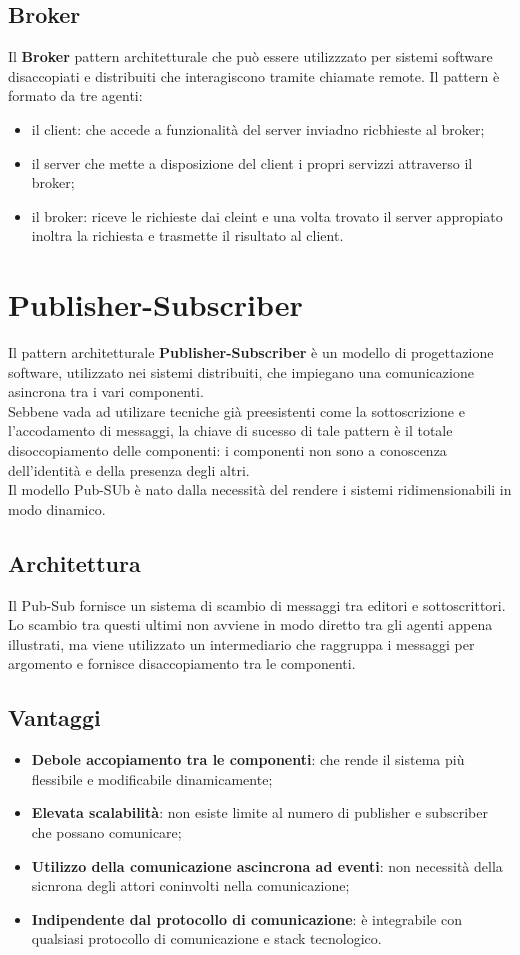 \documentclass{article}
\begin{document}
\subsection{Broker}
Il \textbf{Broker} pattern architetturale che può essere utilizzzato per sistemi software disaccopiati e distribuiti che interagiscono tramite chiamate remote.
Il pattern è formato da tre agenti:
\begin{itemize}
    \item il client: che accede a funzionalità del server inviadno ricbhieste al broker;
    \item il server che mette a disposizione del client i propri servizzi attraverso il broker;
    \item il broker: riceve le richieste dai cleint e una volta trovato il server appropiato inoltra la richiesta e trasmette il risultato al client.
\end{itemize}
\section{Publisher-Subscriber}
Il pattern architetturale \textbf{Publisher-Subscriber} è un modello di progettazione software, utilizzato nei sistemi distribuiti, che impiegano una comunicazione asincrona tra i vari componenti.\\
Sebbene vada ad utilizare tecniche già preesistenti come la sottoscrizione e l'accodamento di messaggi, la  chiave di sucesso di tale pattern è il totale disoccopiamento delle componenti: i componenti non sono a conoscenza dell'identità e della presenza degli altri.\\
Il modello Pub-SUb è nato dalla necessità del rendere i sistemi ridimensionabili in modo dinamico.
\subsection{Architettura}
Il Pub-Sub fornisce un sistema di scambio di messaggi tra editori e sottoscrittori. Lo scambio tra questi ultimi non avviene in modo diretto tra gli agenti appena illustrati, ma viene utilizzato un intermediario che raggruppa i messaggi per argomento e fornisce disaccopiamento tra le componenti.
\subsection{Vantaggi}
\begin{itemize}
    \item \textbf{Debole accopiamento tra le componenti}: che rende il sistema più flessibile e modificabile dinamicamente;
    \item \textbf{Elevata scalabilità}: non esiste limite al numero di publisher e subscriber che possano comunicare;
    \item \textbf{Utilizzo della comunicazione ascincrona ad eventi}: non necessità della sicnrona degli attori coninvolti nella comunicazione;
    \item \textbf{Indipendente dal protocollo di comunicazione}: è integrabile con qualsiasi protocollo di comunicazione e stack tecnologico.
\end{itemize}
\end{document}
